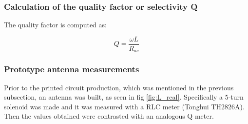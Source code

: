 \documentclass{article} %
\begin{document}
\begin{multicols}{2}


\subsubsection{Calculation of the quality factor or selectivity Q}
The quality factor is computed as:

\begin{equation}
{Q =\frac{\omega L}{R_{ac}}}
\end{equation}


\subsubsection{Prototype antenna measurements}
Prior to the printed circuit production, which was mentioned in the previous subsection, an antenna was built, as seen in fig \ref{fig:L_real}. Specifically a 5-turn solenoid was made and it was measured with a RLC meter (Tonghui TH2826A). Then the values obtained were contrasted with an analogous Q meter.


\end{multicols}
\end{document}
